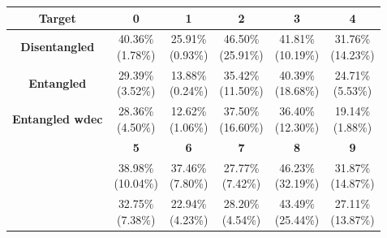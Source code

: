 \documentclass{report}
\begin{document}
\begin{center}
{\tiny
  \begin{tabular}{c|c|c|c|c|c|}
  \hline
  \multicolumn{1}{|c|}{\textbf{Target}} & \textbf{0} & \textbf{1} & \textbf{2} & \textbf{3} & \textbf{4} \\ \hline
  \multicolumn{1}{|c|}{\textbf{Disentangled}} & \cellcolor{light-gray} \makecell{40.36\% \\ (1.78\%)} &  \cellcolor{light-gray} \makecell{25.91\% \\ (0.93\%)} &  \cellcolor{light-gray} \makecell{46.50\% \\ (25.91\%)} & \cellcolor{light-gray} \makecell{41.81\% \\ (10.19\%)} & \cellcolor{light-gray} \makecell{31.76\% \\ (14.23\%)} \\ \hline
  \multicolumn{1}{|c|}{\textbf{Entangled}} & \makecell{29.39\% \\ (3.52\%)} & \makecell{13.88\% \\ (0.24\%)} & \makecell{35.42\% \\ (11.50\%)} & \makecell{40.39\% \\ (18.68\%)} & \makecell{24.71\% \\ (5.53\%)} \\ \hline
  \multicolumn{1}{|c|}{\textbf{Entangled wdec}} & \makecell{28.36\% \\ (4.50\%)} & \makecell{12.62\% \\ (1.06\%)} & \makecell{37.50\% \\ (16.60\%)} & \makecell{36.40\% \\ (12.30\%)} & \makecell{19.14\% \\ (1.88\%)} \\ \hline
  & \textbf{5} & \textbf{6} & \textbf{7} & \textbf{8} & \textbf{9} \\ \cline{2-6}
  & \cellcolor{light-gray} \makecell{38.98\% \\ (10.04\%)} & \cellcolor{light-gray} \makecell{37.46\% \\ (7.80\%)} & \makecell{27.77\% \\ (7.42\%)} & \cellcolor{light-gray} \makecell{46.23\% \\ (32.19\%)} & \cellcolor{light-gray} \makecell{31.87\% \\ (14.87\%)} \\ \cline{2-6}
  & \makecell{32.75\% \\ (7.38\%)} & \makecell{22.94\% \\ (4.23\%)} & \cellcolor{light-gray} \makecell{28.20\% \\ (4.54\%)} & \makecell{43.49\% \\ (25.44\%)} & \makecell{27.11\% \\ (13.87\%)} \\ \cline{2-6}

\end{tabular}}
\end{center}
\end{document}
